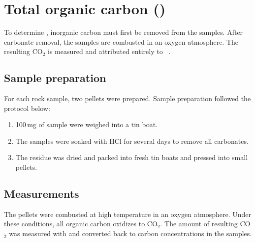 \section{Total organic carbon ()}

To determine \TOC, inorganic carbon must first be removed from the samples. 
After carbonate removal, the samples are combusted in an oxygen atmosphere. 
The resulting CO$_2$ is measured and attributed entirely to \TOC~\parencite{irms}.

\subsection{Sample preparation}

For each rock sample, two pellets were prepared.
Sample preparation followed the protocol below:

\begin{enumerate}
    \item 100\,mg of sample were weighed into a tin boat.
    \item The samples were soaked with HCl for several days to remove all carbonates.
    \item The residue was dried and packed into fresh tin boats and pressed into small pellets.
\end{enumerate}


\subsection{Measurements}

The pellets were combusted at high temperature in an oxygen
atmosphere. Under these conditions, all organic carbon oxidizes to CO$_2$.
The amount of resulting CO$_2$ was measured with  and converted
back to carbon concentrations in the samples.
